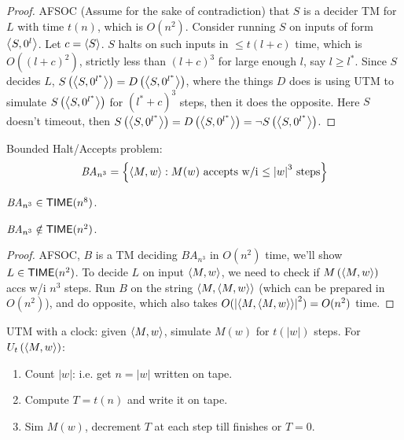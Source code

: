 \documentclass{article}
\begin{document}
\begin{proof}
  AFSOC (Assume for the sake of contradiction) that \(S\) is a decider TM for \(L\) with time \(t(n)\), which is \(O(n^2)\).
  Consider running \(S\) on inputs of form \(\left\langle S, 0^l \right\rangle\).
  Let \(c = \left\langle S \right\rangle\). \(S\) halts on such inputs in \(\leq t(l + c)\) time, which is \(O((l+c)^2)\), strictly less than \((l+c)^3\) for large enough \(l\), say \(l \geq l^*\).
  Since \(S\) decides \(L\), \(S\left\lparen \left\langle S, 0^{l^*} \right\rangle \right\rparen = D\left\lparen \left\langle S, 0^{l^*} \right\rangle \right\rparen\), where the things \(D\) does is using UTM to simulate \(S\left\lparen \left\langle S, 0^{l^*} \right\rangle \right\rparen\) for \((l^* + c)^3\) steps, then it does the opposite.
  Here \(S\) doesn't timeout, then \(S\left\lparen \left\langle S, 0^{l^*} \right\rangle \right\rparen = D\left\lparen \left\langle S, 0^{l^*} \right\rangle \right\rparen = \neg S\left\lparen \left\langle S, 0^{l^*} \right\rangle \right\rparen\).
\end{proof}

\begin{definition}
  Bounded Halt/Accepts problem:
  \[ \mathit{BA}_{n^3} = \left\lbrace \left\langle M, w \right\rangle : \text{\(M(w)\) accepts w/i \(\leq \left\lvert w \right\rvert^3\) steps} \right\rbrace \]
\end{definition}

\begin{claim}
  \(\mathit{BA}_{n^3} \in \text{\sf TIME}(n^8)\).
\end{claim}

\begin{claim}
  \(\mathit{BA}_{n^3} \notin \text{\sf TIME}(n^2)\).
\end{claim}

\begin{proof}
  AFSOC, \(B\) is a TM deciding \(\mathit{BA}_{n^3}\) in \(O(n^2)\) time, we'll show \(L \in \text{\sf TIME}(n^2)\).
  To decide \(L\) on input \(\left\langle M, w \right\rangle\), we need to check if \(M\left\lparen \left\langle M, w \right\rangle \right\rparen\) accs w/i \(n^3\) steps.
  Run \(B\) on the string \(\left\langle M, \left\langle M, w \right\rangle \right\rangle\) (which can be prepared in \(O(n^2)\)), and do opposite, which also takes \(O(\left\lvert \left\langle M, \left\langle M, w \right\rangle \right\rangle \right\rvert^2) = O(n^2)\) time.
\end{proof}

UTM with a clock: given \(\left\langle M, w \right\rangle\), simulate \(M(w)\) for \(t(|w|)\) steps. For \(U_t\left\lparen \left\langle M, w \right\rangle \right\rparen\):
\begin{enumerate}
  \item Count \(|w|\): i.e. get \(n = |w|\) written on tape.
  \item Compute \(T = t(n)\) and write it on tape.
  \item Sim \(M(w)\), decrement \(T\) at each step till finishes or \(T = 0\).
\end{enumerate}
\end{document}

